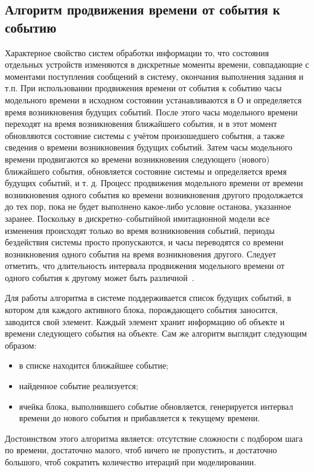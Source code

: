 \subsection{Алгоритм продвижения времени от события к событию}

Характерное свойство систем обработки информации то, что состояния отдельных устройств изменяются в дискретные моменты времени, совпадающие с моментами поступления сообщений в систему, окончания
выполнения задания и т.п. При использовании продвижения времени от события к событию часы модельного времени в исходном состоянии устанавливаются в О и определяется время возникновения будущих событий. После этого часы модельного времени переходят на время возникновения ближайшего события, и в этот момент обновляются состояние системы с учётом произошедшего события, а также сведения о времени возникновения будущих событий. Затем часы модельного времени продвигаются ко времени возникновения следующего (нового) ближайшего события, обновляется состояние системы и определяется время будущих событий, и т. д. Процесс продвижения модельного времени от времени возникновения одного события ко времени возникновения другого продолжается до тех пор, пока не будет выполнено какое-либо условие останова, указанное заранее. Поскольку в дискретно--событийной имитационной модели все изменения происходят только во время возникновения событий, периоды бездействия системы просто пропускаются, и часы переводятся со времени возникновения одного события на время возникновения другого. Следует отметить, что длительность интервала продвижения модельного времени от одного события к другому может быть различной~\cite{time_alg}.

Для работы алгоритма в системе поддерживается список будущих событий, в котором для каждого активного блока, порождающего события заносится, заводится свой элемент. Каждый элемент хранит информацию об объекте и времени следующего события на объекте. Сам же алгоритм выглядит следующим образом:
\begin{itemize}[label=---]
	\item в списке находится ближайшее событие; 
	\item найденное событие реализуется;
	\item ячейка блока, выполнившего событие обновляется, генерируется интервал времени до нового события и прибавляется к текущему времени.
\end{itemize}

Достоинством этого алгоритма является: отсутствие сложности с подбором шага по времени, достаточно малого, чтоб ничего не пропустить, и достаточно большого, чтоб сократить количество итераций при моделировании.

